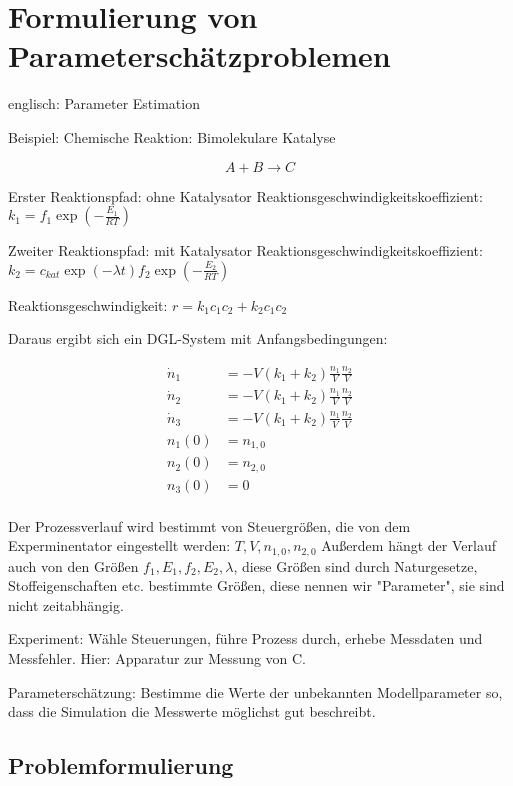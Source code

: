\chapter*{Formulierung von Parameterschätzproblemen}

englisch: Parameter Estimation

Beispiel: Chemische Reaktion: Bimolekulare Katalyse

\[A+B \to C\]

Erster Reaktionspfad: ohne Katalysator
Reaktionsgeschwindigkeitskoeffizient: $k_1 = f_1 \exp(-\frac{E_1}{RT})$

Zweiter Reaktionspfad: mit Katalysator
Reaktionsgeschwindigkeitskoeffizient: $k_2 = c_{kat} \exp(-\lambda t) f_2 \exp(-\frac{E_2}{RT})$

Reaktionsgeschwindigkeit: $r= k_1 c_1 c_2 + k_2 c_1 c_2$

Daraus ergibt sich ein DGL-System mit Anfangsbedingungen:

\begin{align*}
\dot n_1 &= -V(k_1+k_2) \frac{n_1}V \frac{n_2}V \\
\dot n_2 &= -V(k_1+k_2) \frac{n_1}V \frac{n_2}V \\
\dot n_3 &= -V(k_1+k_2) \frac{n_1}V \frac{n_2}V \\
n_1(0) &= n_{1,0} \\
n_2(0) &= n_{2,0} \\
n_3(0) &= 0 \\
\end{align*}


Der Prozessverlauf wird bestimmt von Steuergrößen, die von dem Experminentator eingestellt werden: $T,V,n_{1,0},n_{2,0}$ 
Außerdem hängt der Verlauf auch von den Größen $f_1,E_1,f_2,E_2,\lambda$, diese Größen sind durch Naturgesetze, Stoffeigenschaften etc. bestimmte Größen, diese nennen wir "Parameter", sie sind nicht zeitabhängig.

Experiment: Wähle Steuerungen, führe Prozess durch, erhebe Messdaten und Messfehler. Hier: Apparatur zur Messung von C.


Parameterschätzung: Bestimme die Werte der unbekannten Modellparameter so, dass die Simulation die Messwerte möglichst gut beschreibt.

\section*{Problemformulierung}

